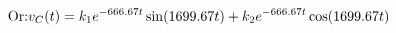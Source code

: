 \documentclass[preview]{standalone}
\begin{document}
\begin{center}
\begin{align*}
                                \text{Or:} \hfill & v_C(t) = k_1e^{-666.67t}\sin(1699.67t) + k_2e^{-666.67t}\cos(1699.67t)
                                \end{align*}
\end{center}
\end{document}
